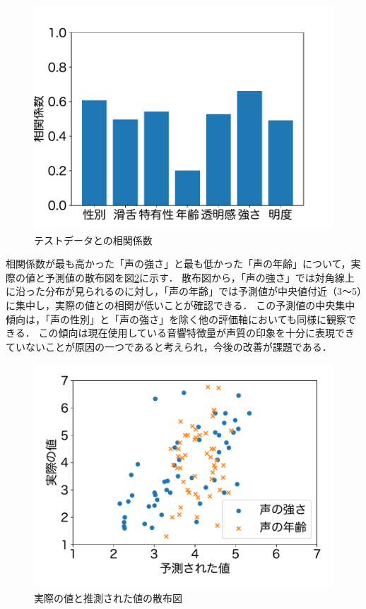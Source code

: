 \documentclass{jarticle}
\begin{document}
\begin{figure}[h]
    \centering
    \includegraphics[width=\linewidth]{fig/model_quality_coor.pdf}
    \caption{テストデータとの相関係数}
    \label{tab:score_coor}
\end{figure}

相関係数が最も高かった「声の強さ」と最も低かった「声の年齢」について，実際の値と予測値の散布図を図\ref{fig:scatter}に示す．
散布図から，「声の強さ」では対角線上に沿った分布が見られるのに対し，「声の年齢」では予測値が中央値付近（3〜5）に集中し，実際の値との相関が低いことが確認できる．
この予測値の中央集中傾向は，「声の性別」と「声の強さ」を除く他の評価軸においても同様に観察できる．
この傾向は現在使用している音響特徴量が声質の印象を十分に表現できていないことが原因の一つであると考えられ，今後の改善が課題である．

\begin{figure}[h]
  \centering
  \includegraphics[width=\linewidth]{fig/scatter.pdf}
  \caption{実際の値と推測された値の散布図}
  \label{fig:scatter}
\end{figure}
\end{document}
